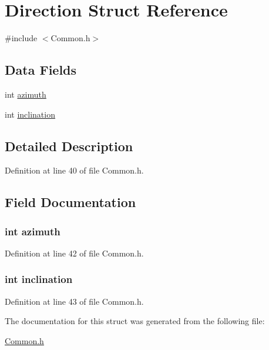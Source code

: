 \hypertarget{struct_direction}{\section{Direction Struct Reference}
\label{struct_direction}
}


{\ttfamily \#include $<$Common.\+h$>$}

\subsection*{Data Fields}
\begin{DoxyCompactItemize}
\item 
int \hyperlink{struct_direction_a866e78e12cb32dcaf1ded89bda8be8f5}{azimuth}
\item 
int \hyperlink{struct_direction_af308b9934394c8bcf7614eb1df2d863f}{inclination}
\end{DoxyCompactItemize}


\subsection{Detailed Description}


Definition at line 40 of file Common.\+h.



\subsection{Field Documentation}
\hypertarget{struct_direction_a866e78e12cb32dcaf1ded89bda8be8f5}{
\subsubsection[{azimuth}]{\setlength{\rightskip}{0pt plus 5cm}int azimuth}}\label{struct_direction_a866e78e12cb32dcaf1ded89bda8be8f5}


Definition at line 42 of file Common.\+h.

\hypertarget{struct_direction_af308b9934394c8bcf7614eb1df2d863f}{
\subsubsection[{inclination}]{\setlength{\rightskip}{0pt plus 5cm}int inclination}}\label{struct_direction_af308b9934394c8bcf7614eb1df2d863f}


Definition at line 43 of file Common.\+h.



The documentation for this struct was generated from the following file\+:\begin{DoxyCompactItemize}
\item 
\hyperlink{_common_8h}{Common.\+h}\end{DoxyCompactItemize}
